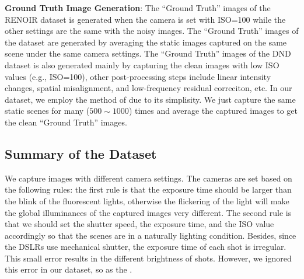 \textbf{Ground Truth Image Generation}: The ``Ground Truth'' images of the RENOIR dataset \cite{RENOIR2014} is generated when the camera is set with ISO=100 while the other settings are the same with the noisy images. The ``Ground Truth'' images of the dataset \cite{crosschannel2016} are generated by averaging the static images captured on the same scene under the same camera settings. The ``Ground Truth'' images of the DND dataset \cite{dnd2017} is also generated mainly by capturing the clean images with low ISO values (e.g., ISO=100), other post-processing steps include   linear intensity changes, spatial misalignment, and low-frequency residual correciton, etc. In our dataset, we employ the method of \cite{crosschannel2016} due to its simplisity. We just capture the same static scenes for many ($500\sim1000$) times and average the captured images to get the clean ``Ground Truth'' images.
 

\subsection{Summary of the Dataset}

We capture images with different camera settings. The cameras are set based on the following rules: the first rule is that the exposure time should be larger than the blink of the fluorescent lights, otherwise the flickering of the light will make the global illuminances of the captured images very different. The second rule is that we should set the shutter speed, the exposure time, and the ISO value accordingly so that the scenes are in a naturally lighting condition. Besides, since the DSLRs use mechanical shutter, the exposure time of each shot is irregular. This small error results in the different brightness of shots. However, we ignored this error in our dataset, so as the \cite{crosschannel2016}.

